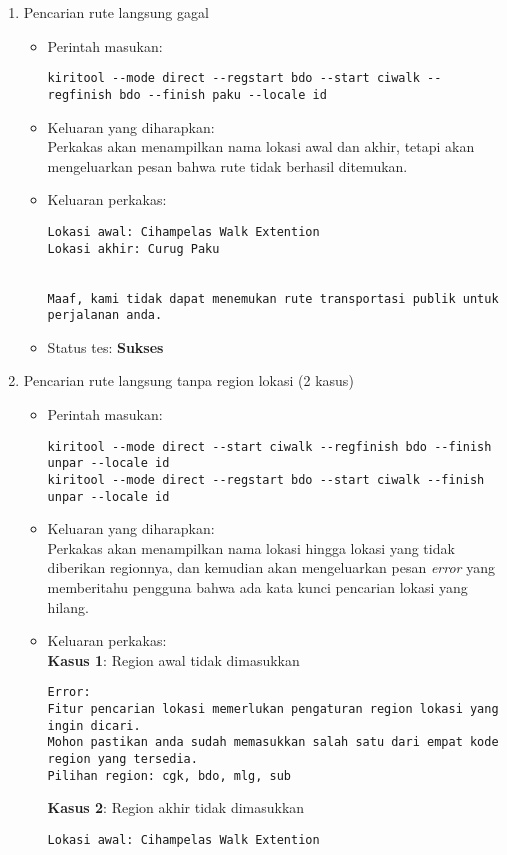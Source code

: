 \begin{enumerate}
	\item Pencarian rute langsung gagal
	\begin{itemize}
		\item Perintah masukan:
		\begin{lstlisting}
kiritool --mode direct --regstart bdo --start ciwalk --regfinish bdo --finish paku --locale id
		\end{lstlisting}
		\item Keluaran yang diharapkan: \\
		Perkakas akan menampilkan nama lokasi awal dan akhir, tetapi akan mengeluarkan pesan bahwa rute tidak berhasil ditemukan.
		\item Keluaran perkakas:
		\begin{lstlisting}
Lokasi awal: Cihampelas Walk Extention
Lokasi akhir: Curug Paku


Maaf, kami tidak dapat menemukan rute transportasi publik untuk perjalanan anda.
		\end{lstlisting}
		\item Status tes: \textbf{Sukses}
	\end{itemize}
	
	\item Pencarian rute langsung tanpa region lokasi (2 kasus)
	\begin{itemize}
		\item Perintah masukan:
		\begin{lstlisting}
kiritool --mode direct --start ciwalk --regfinish bdo --finish unpar --locale id
kiritool --mode direct --regstart bdo --start ciwalk --finish unpar --locale id
		\end{lstlisting}
		\item Keluaran yang diharapkan: \\
		Perkakas akan menampilkan nama lokasi hingga lokasi yang tidak diberikan regionnya, dan kemudian akan mengeluarkan pesan \textit{error} yang memberitahu pengguna bahwa ada kata kunci pencarian lokasi yang hilang.
		\item Keluaran perkakas: \\
		\textbf{Kasus 1}: Region awal tidak dimasukkan
		\begin{lstlisting}
Error:
Fitur pencarian lokasi memerlukan pengaturan region lokasi yang ingin dicari.
Mohon pastikan anda sudah memasukkan salah satu dari empat kode region yang tersedia.
Pilihan region: cgk, bdo, mlg, sub
		\end{lstlisting}
		\textbf{Kasus 2}: Region akhir tidak dimasukkan
		\begin{lstlisting}
Lokasi awal: Cihampelas Walk Extention


\end{lstlisting}
\end{itemize}
\end{enumerate}
